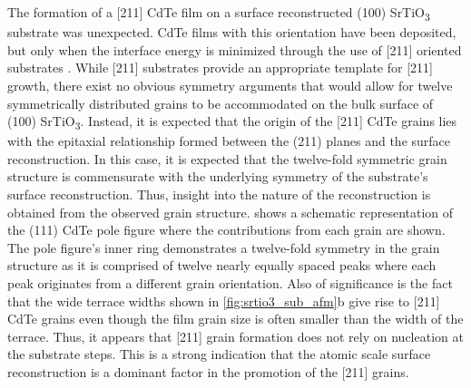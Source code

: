 The formation of a [211] CdTe film on a surface reconstructed (100) SrTiO\textsubscript{3} substrate was unexpected.
CdTe films with this orientation have been deposited, but only when the interface energy is minimized through the use of [211] oriented substrates \cite{Lange1991b,Million1996,Rujirawat1997a,Zanatta1998}.
While [211] substrates provide an appropriate template for [211] growth, there exist no obvious symmetry arguments that would allow for twelve symmetrically distributed grains to be accommodated on the bulk surface of (100) SrTiO\textsubscript{3}.
Instead, it is expected that the origin of the [211] CdTe grains lies with the epitaxial relationship formed between the (211) planes and the surface reconstruction.
In this case, it is expected that the twelve-fold symmetric grain structure is commensurate with the underlying symmetry of the substrate’s surface reconstruction.
Thus, insight into the nature of the reconstruction is obtained from the observed grain structure.
 shows a schematic representation of the (111) CdTe pole figure where the contributions from each grain are shown.
The pole figure’s inner ring demonstrates a twelve-fold symmetry in the grain structure as it is comprised of twelve nearly equally spaced peaks where each peak originates from a different grain orientation.
Also of significance is the fact that the wide terrace widths shown in \cref{fig:srtio3_sub_afm}b give rise to [211] CdTe grains even though the film grain size is often smaller than the width of the terrace.
Thus, it appears that [211] grain formation does not rely on nucleation at the substrate steps.
This is a strong indication that the atomic scale surface reconstruction is a dominant factor in the promotion of the [211] grains.


